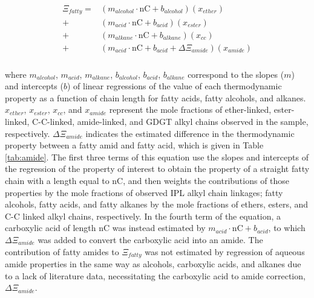 \begin{align}
\begin{split}
\Xi_{fatty} = & (m_{alcohol}\cdot \text{nC} + b_{alcohol})(x_{ether}) \\
            + & (m_{acid}\cdot \text{nC} + b_{acid})(x_{ester}) \\
            + & (m_{alkane}\cdot \text{nC} + b_{alkane})(x_{cc}) \\
            + & (m_{acid}\cdot \text{nC} + b_{acid} + \Delta\Xi_{amide})(x_{amide}) \\
\end{split}
\end{align}

\noindent where $m_{alcohol}$, $m_{acid}$, $m_{alkane}$, $b_{alcohol}$, $b_{acid}$, $b_{alkane}$ correspond to the slopes ($m$) and intercepts ($b$) of linear regressions of the value of each thermodynamic property as a function of chain length for fatty acids, fatty alcohols, and alkanes. $x_{ether}$, $x_{ester}$, $x_{cc}$, and $x_{amide}$ represent the mole fractions of ether-linked, ester-linked, C-C-linked, amide-linked, and GDGT alkyl chains observed in the sample, respectively. $\Delta\Xi_{amide}$ indicates the estimated difference in the thermodynamic property between a fatty amid and fatty acid, which is given in Table \ref{tab:amide}. The first three terms of this equation use the slopes and intercepts of the regression of the property of interest to obtain the property of a straight fatty chain with a length equal to nC, and then weights the contributions of those properties by the mole fractions of observed IPL alkyl chain linkages; fatty alcohols, fatty acids, and fatty alkanes by the mole fractions of ethers, esters, and C-C linked alkyl chains, respectively. In the fourth term of the equation, a carboxylic acid of length nC was instead estimated by $m_{acid}\cdot \text{nC} + b_{acid}$, to which $\Delta\Xi_{amide}$ was added to convert the carboxylic acid into an amide. The contribution of fatty amides to $\Xi_{fatty}$ was not estimated by regression of aqueous amide properties in the same way as alcohols, carboxylic acids, and alkanes due to a lack of literature data, necessitating the carboxylic acid to amide correction, $\Delta\Xi_{amide}$.


